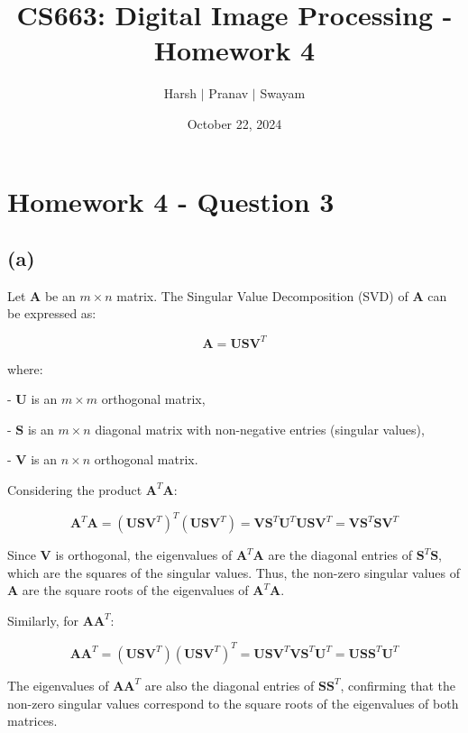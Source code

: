 \documentclass{article}
\title{CS663: Digital Image Processing - Homework 4}
\author{Harsh $\vert$ Pranav $\vert$ Swayam}
\date{October 22, 2024}
\begin{document}
\maketitle
\flushleft
\section*{Homework 4 - Question 3}

\subsection*{(a)}

Let \(\mathbf{A}\) be an \( m \times n \) matrix. The Singular Value Decomposition (SVD) of \(\mathbf{A}\) can be expressed as:

\[
\mathbf{A} = \mathbf{U} \mathbf{S} \mathbf{V}^T
\]

where:

- \(\mathbf{U}\) is an \( m \times m \) orthogonal matrix,

- \(\mathbf{S}\) is an \( m \times n \) diagonal matrix with non-negative entries (singular values),

- \(\mathbf{V}\) is an \( n \times n \) orthogonal matrix.

Considering the product \(\mathbf{A}^T\mathbf{A}\):

\[
\mathbf{A}^T\mathbf{A} = (\mathbf{U} \mathbf{S} \mathbf{V}^T)^T (\mathbf{U} \mathbf{S} \mathbf{V}^T) = \mathbf{V} \mathbf{S}^T \mathbf{U}^T \mathbf{U} \mathbf{S} \mathbf{V}^T = \mathbf{V} \mathbf{S}^T \mathbf{S} \mathbf{V}^T
\]

Since \(\mathbf{V}\) is orthogonal, the eigenvalues of \(\mathbf{A}^T\mathbf{A}\) are the diagonal entries of \(\mathbf{S}^T \mathbf{S}\), which are the squares of the singular values. Thus, the non-zero singular values of \(\mathbf{A}\) are the square roots of the eigenvalues of \(\mathbf{A}^T\mathbf{A}\).

Similarly, for \(\mathbf{A}\mathbf{A}^T\):

\[
\mathbf{A}\mathbf{A}^T = (\mathbf{U} \mathbf{S} \mathbf{V}^T)(\mathbf{U} \mathbf{S} \mathbf{V}^T)^T = \mathbf{U} \mathbf{S} \mathbf{V}^T \mathbf{V} \mathbf{S}^T \mathbf{U}^T = \mathbf{U} \mathbf{S} \mathbf{S}^T \mathbf{U}^T
\]

The eigenvalues of \(\mathbf{A}\mathbf{A}^T\) are also the diagonal entries of \(\mathbf{S} \mathbf{S}^T\), confirming that the non-zero singular values correspond to the square roots of the eigenvalues of both matrices.
\end{document}
